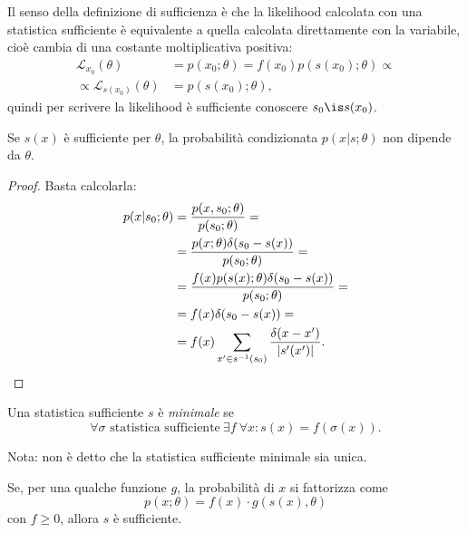 Il senso della definizione di sufficienza
è che la likelihood calcolata con una statistica sufficiente
è equivalente a quella calcolata direttamente con la variabile,
cioè cambia di una costante moltiplicativa positiva:
\begin{align*}
	\mathcal L_{x_0}(\theta)
	&= p(x_0;\theta) = f(x_0) p(s(x_0);\theta) \propto \\
	\propto \mathcal L_{s(x_0)}(\theta)
	&= p(s(x_0);\theta),
\end{align*}
quindi per scrivere la likelihood è sufficiente conoscere $s_0 \is s(x_0)$.

\begin{theorem}
	Se $s(x)$ è sufficiente per $\theta$,
	la probabilità condizionata $p(x|s;\theta)$ non dipende da $\theta$.
\end{theorem}

\begin{proof}
	Basta calcolarla:
	\begin{align*}
		p(x|s_0;\theta)
		&= \frac {p(x,s_0;\theta)} {p(s_0;\theta)} = \\
		&= \frac {p(x;\theta) \delta(s_0-s(x))} {p(s_0;\theta)} = \\
		&= \frac {f(x) p(s(x);\theta) \delta(s_0-s(x))} {p(s_0;\theta)} = \\
		&= f(x) \delta(s_0-s(x)) = \\
		&= f(x) \sum_{x'\in s^{-1}(s_0)} \frac {\delta(x-x')} {|s'(x')|}. \qedhere
	\end{align*}
\end{proof}

\begin{definition}
	Una statistica sufficiente $s$ è \emph{minimale} se
	\begin{equation*}
		\forall \sigma \text{ statistica sufficiente}\ \exists f\ \forall x:
		s(x) = f(\sigma(x)).
	\end{equation*}
\end{definition}
\noindent Nota: non è detto che la statistica sufficiente minimale sia unica.

\begin{theorem}
	\label{th:suffatt}
	Se, per una qualche funzione $g$, la probabilità di $x$ si fattorizza come
	\begin{equation*}
		p(x;\theta) = f(x)\cdot g(s(x),\theta)
	\end{equation*}
	con $f\ge 0$, allora $s$ è sufficiente.
\end{theorem}

